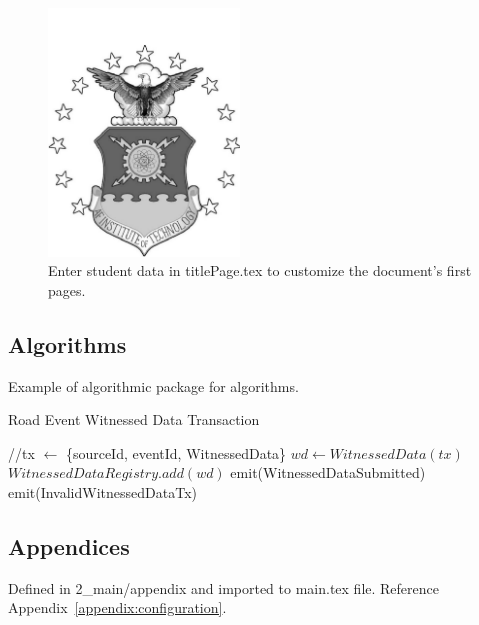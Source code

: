     \begin{figure}[tbp]
        \vspace{20pt}
        \begin{center}
            \includegraphics[width=2in]{5_figures/afitlogo}
            \caption{Enter student data in titlePage.tex to customize the document's first pages.}
         \label{fig:titlePageTwo}
     \end{center}
    \end{figure}

\subsection{Algorithms}
    Example of algorithmic package for algorithms.
    
    \begin{algorithm}[!h]
        	\caption{Road Event Witnessed Data Transaction}
        	\begin{algorithmic}[1]
        		\State //tx $\leftarrow$ \{sourceId, eventId, WitnessedData\}
        		\State $wd \leftarrow WitnessedData(tx)$
        		\State $WitnessedDataRegistry.add(wd)$
        		\State emit(WitnessedDataSubmitted)
        		\Else
        		\State emit(InvalidWitnessedDataTx)
        		\EndIf
        	\end{algorithmic}
        	\label{algo:submitWitness}
        \end{algorithm}

\subsection{Appendices}
    Defined in 2\_main/appendix and imported to main.tex file. Reference Appendix~\ref{appendix:configuration}.

